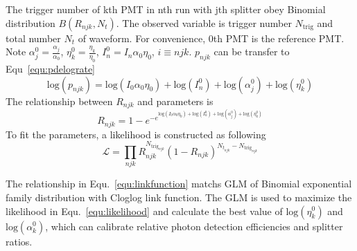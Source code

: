 The trigger number of kth PMT in nth run with jth splitter obey Binomial distribution $B(R_{njk},N_t)$. The observed variable is trigger number $N_{\mathrm{trig}}$ and total number $N_{t}$ of waveform. For convenience, 0th PMT is the reference PMT. Note $\alpha_j^0=\frac{\alpha_j}{\alpha_0}$, $\eta_k^0=\frac{\eta_k}{\eta_0}$, $I_n^0=I_n\alpha_0\eta_0$, $i\equiv njk$. $p_{njk}$ can be transfer to Equ~\eqref{equ:pdelograte}
\begin{equation}
    \label{equ:pdelograte}
    \mathrm{log}(p_{njk})=\mathrm{log}(I_0\alpha_0\eta_0)+\mathrm{log}(I_n^0)+\mathrm{log}(\alpha_j^0)+\mathrm{log}(\eta_k^0)
\end{equation}
The relationship between $R_{njk}$ and parameters is
\begin{equation}
    \label{equ:linkfunction}
    R_{njk}=1-e^{-e^{\mathrm{log}(I_0\alpha_0\eta_0)+\mathrm{log}(I_n^0)+\mathrm{log}(\alpha_j^0)+\mathrm{log}(\eta_k^0)}}
\end{equation}
To fit the parameters, a likelihood is constructed as following
\begin{equation}
    \label{equ:likelihood}
    \mathcal{L}=\prod_{njk}{R_{njk}^{N_{\mathrm{trig}_{njk}}}(1-R_{njk})^{N_{t_{njk}}-N_{\mathrm{trig}_{njk}}}}
\end{equation}

The relationship in Equ.~\eqref{equ:linkfunction} matchs GLM of Binomial exponential family distribution with Cloglog link function\cite{glm}. The GLM is used to maximize the likelihood in Equ.~\eqref{equ:likelihood} and calculate the best value of $\mathrm{log}(\eta_k^0)$ and $\mathrm{log}(\alpha_k^0)$, which can calibrate relative photon detection efficiencies and splitter ratios.